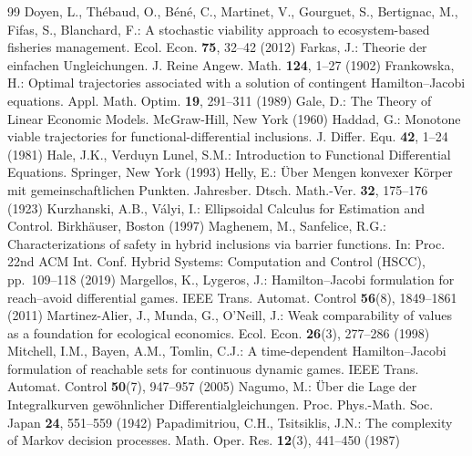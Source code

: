 \documentclass[11pt,a4paper]{article}
\theoremstyle{plain}
\theoremstyle{definition}
\theoremstyle{remark}
\begin{document}
\begin{thebibliography}{99}
 Doyen, L., Th\'ebaud, O., B\'en\'e, C., Martinet, V., Gourguet, S., Bertignac, M., Fifas, S., Blanchard, F.: A stochastic viability approach to ecosystem-based fisheries management. Ecol. Econ. \textbf{75}, 32--42 (2012)
 Farkas, J.: Theorie der einfachen Ungleichungen. J. Reine Angew. Math. \textbf{124}, 1--27 (1902)
 Frankowska, H.: Optimal trajectories associated with a solution of contingent Hamilton--Jacobi equations. Appl. Math. Optim. \textbf{19}, 291--311 (1989)
 Gale, D.: The Theory of Linear Economic Models. McGraw-Hill, New York (1960)
 Haddad, G.: Monotone viable trajectories for functional-differential inclusions. J. Differ. Equ. \textbf{42}, 1--24 (1981)
 Hale, J.K., Verduyn Lunel, S.M.: Introduction to Functional Differential Equations. Springer, New York (1993)
 Helly, E.: \"Uber Mengen konvexer K\"orper mit gemeinschaftlichen Punkten. Jahresber. Dtsch. Math.-Ver. \textbf{32}, 175--176 (1923)
 Kurzhanski, A.B., V\'alyi, I.: Ellipsoidal Calculus for Estimation and Control. Birkh\"auser, Boston (1997)
 Maghenem, M., Sanfelice, R.G.: Characterizations of safety in hybrid inclusions via barrier functions. In: Proc. 22nd ACM Int. Conf. Hybrid Systems: Computation and Control (HSCC), pp.~109--118 (2019)
 Margellos, K., Lygeros, J.: Hamilton--Jacobi formulation for reach--avoid differential games. IEEE Trans. Automat. Control \textbf{56}(8), 1849--1861 (2011)
 Martinez-Alier, J., Munda, G., O'Neill, J.: Weak comparability of values as a foundation for ecological economics. Ecol. Econ. \textbf{26}(3), 277--286 (1998)
 Mitchell, I.M., Bayen, A.M., Tomlin, C.J.: A time-dependent Hamilton--Jacobi formulation of reachable sets for continuous dynamic games. IEEE Trans. Automat. Control \textbf{50}(7), 947--957 (2005)
 Nagumo, M.: \"Uber die Lage der Integralkurven gew\"ohnlicher Differentialgleichungen. Proc. Phys.-Math. Soc. Japan \textbf{24}, 551--559 (1942)
 Papadimitriou, C.H., Tsitsiklis, J.N.: The complexity of Markov decision processes. Math. Oper. Res. \textbf{12}(3), 441--450 (1987)

\end{thebibliography}
\end{document}
